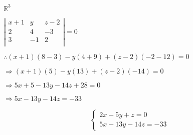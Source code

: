 \documentclass{article}
\def\lthtmlcheckvsize{\ifdim\ht\sizebox<\vsize 
  \ifdim\wd\sizebox<\hsize\expandafter\hfill\fi \expandafter\vfill
  \else\expandafter\vss\fi}%
\begin{document}
{\newpage\clearpage
{}%
$ \mathbb{R}^3$%
\lthtmlindisplaymathZ
\lthtmlcheckvsize\clearpage}

{\newpage\clearpage
{}%
$ \left|
\begin{smallmatrix}
x+1 & y & z-2\\
2 & 4 & -3\\
3 & -1 & 2\\
\end{smallmatrix}
\right|=0$%
\lthtmlindisplaymathZ
\lthtmlcheckvsize\clearpage}

{\newpage\clearpage
{}%

$ \therefore (x+1)(8-3)-y(4+9)+(z-2)(-2-12)=0$%
\lthtmlindisplaymathZ
\lthtmlcheckvsize\clearpage}

{\newpage\clearpage
{}%
$ \Rightarrow (x+1)(5)-y(13)+(z-2)(-14)=0$%
\lthtmlindisplaymathZ
\lthtmlcheckvsize\clearpage}

{\newpage\clearpage
{}%
$ \Rightarrow 5x+5-13y-14z+28=0$%
\lthtmlindisplaymathZ
\lthtmlcheckvsize\clearpage}

{\newpage\clearpage
{}%
$ \Rightarrow 5x-13y-14z=-33$%
\lthtmlindisplaymathZ
\lthtmlcheckvsize\clearpage}

{\newpage\clearpage
{}%
\begin{displaymath}\begin{cases}
2x-5y+z=0\\5x-13y-14z=-33
\end{cases}\end{displaymath}%
\lthtmldisplayZ
\lthtmlcheckvsize\clearpage}
\end{document}
